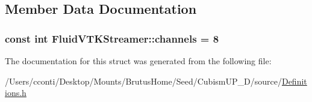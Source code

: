 \subsection{Member Data Documentation}
\hypertarget{struct_fluid_v_t_k_streamer_adcb0db4a89f427581c00828b0029f6b1}{}
\subsubsection[{channels}]{\setlength{\rightskip}{0pt plus 5cm}const int Fluid\+V\+T\+K\+Streamer\+::channels = 8\hspace{0.3cm}{\ttfamily [static]}}\label{struct_fluid_v_t_k_streamer_adcb0db4a89f427581c00828b0029f6b1}


The documentation for this struct was generated from the following file\+:\begin{DoxyCompactItemize}
\item 
/\+Users/cconti/\+Desktop/\+Mounts/\+Brutus\+Home/\+Seed/\+Cubism\+U\+P\+\_\+D/source/\hyperlink{_definitions_8h}{Definitions.\+h}\end{DoxyCompactItemize}
